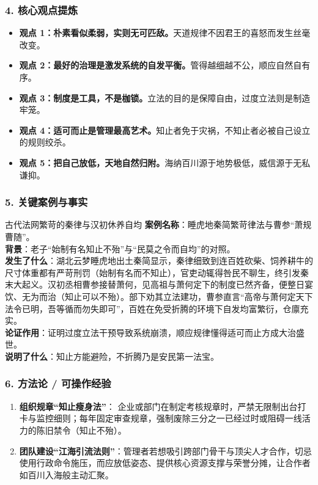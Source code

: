 \subsubsection{4. 核心观点提炼}
\begin{itemize}
    \item \textbf{观点 1：朴素看似柔弱，实则无可匹敌。}天道规律不因君王的喜怒而发生丝毫改变。
    \item \textbf{观点 2：最好的治理是激发系统的自发平衡。}管得越细越不公，顺应自然自有序。
    \item \textbf{观点 3：制度是工具，不是枷锁。}立法的目的是保障自由，过度立法则是制造牢笼。
    \item \textbf{观点 4：适可而止是管理最高艺术。}知止者免于灾祸，不知止者必被自己设立的规则绞杀。
    \item \textbf{观点 5：把自己放低，天地自然归附。}海纳百川源于地势极低，威信源于无私谦抑。
\end{itemize}

\subsubsection{5. 关键案例与事实}
\begin{CaseBox}{古代法网繁苛的秦律与汉初休养自均}
\textbf{案例名称}：睡虎地秦简繁苛律法与曹参“萧规曹随”。\\
\textbf{背景}：老子“始制有名知止不殆”与“民莫之令而自均”的对照。\\
\textbf{发生了什么}：湖北云梦睡虎地出土秦简显示，秦律细致到连百姓砍柴、饲养耕牛的尺寸体重都有严苛刑罚（始制有名而不知止），官吏动辄得咎民不聊生，终引发秦末大起义。汉初丞相曹参接替萧何，见高祖与萧何定下的制度已然齐备，便整日宴饮、无为而治（知止可以不殆）。部下劝其立法建功，曹参直言“高帝与萧何定天下法令已明，吾等循而勿失即可”，百姓在免受折腾的环境下自发均富繁衍，仓廪充实。\\
\textbf{论证作用}：证明过度立法干预导致系统崩溃，顺应规律懂得适可而止方成大治盛世。\\
\textbf{说明了什么}：知止方能避险，不折腾乃是安民第一法宝。
\end{CaseBox}

\subsubsection{6. 方法论 / 可操作经验}
\begin{enumerate}
    \item \textbf{组织规章“知止瘦身法”}：
    企业或部门在制定考核规章时，严禁无限制出台打卡与监控细则；每年固定审查规章，强制废除三分之一已经过时或阻碍一线活力的陈旧禁令（知止不殆）。
    \item \textbf{团队建设“江海引流法则”}：管理者若想吸引跨部门骨干与顶尖人才合作，切忌使用行政命令施压，而应放低姿态、提供核心资源支撑与荣誉分摊，让合作者如百川入海般主动汇聚。
\end{enumerate}

